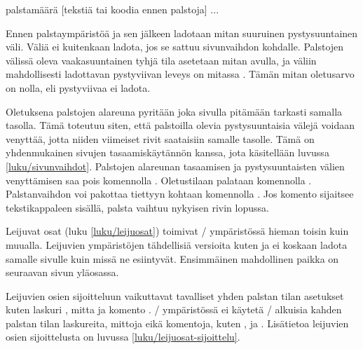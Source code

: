 \begin{koodilohkosis}
\begin{multicols}{palstamäärä}
  [tekstiä tai koodia ennen palstoja]
  ...
\end{multicols}
\end{koodilohkosis}

\noindent
Ennen palstaympäristöä ja sen jälkeen ladotaan mitan 
suuruinen pystysuuntainen väli. Väliä ei kuitenkaan ladota, jos se
sattuu sivunvaihdon kohdalle. Palstojen välissä oleva vaakasuuntainen
tyhjä tila asetetaan mitan  avulla, ja väliin
mahdollisesti ladottavan pystyviivan leveys on mitassa
. Tämän mitan oletusarvo on nolla, eli pystyviivaa
ei ladota.

\begin{koodilohkosis}
\setlength{\multicolsep}{.5ex plus .2ex}  %
\setlength{\columnsep}{6mm}               %
\setlength{\columnseprule}{.2mm}          %
\end{koodilohkosis}

\noindent
Oletuksena palstojen alareuna pyritään joka sivulla pitämään tarkasti
samalla tasolla. Tämä toteutuu siten, että palstoilla olevia
pystysuuntaisia välejä voidaan venyttää, jotta niiden viimeiset rivit
saataisiin samalle tasolle. Tämä on yhdenmukainen sivujen
tasaamiskäytännön kanssa, jota käsitellään luvussa
\ref{luku/sivunvaihdot}. Palstojen alareunan tasaamisen ja
pystysuuntaisten välien venyttämisen saa pois komennolla
. Oletustilaan palataan komennolla
. Palstanvaihdon voi pakottaa tiettyyn kohtaan
komennolla . Jos komento sijaitsee tekstikappaleen
sisällä, palsta vaihtuu nykyisen rivin lopussa.

Leijuvat osat (luku \ref{luku/leijuosat}) toimivat
\-/ ympäristössä hieman toisin kuin muualla.
Leijuvien ympäristöjen tähdellisiä versioita kuten  ja
 ei koskaan ladota samalle sivulle kuin missä ne
esiintyvät. Ensimmäinen mahdollinen paikka on seuraavan sivun yläosassa.

Leijuvien osien sijoitteluun vaikuttavat tavalliset yhden palstan tilan
asetukset kuten laskuri , mitta  ja
komento . \-/ ympäristössä ei
käytetä \-/ alkuisia kahden palstan tilan laskureita, mittoja
eikä komentoja, kuten ,  ja
. Lisätietoa leijuvien osien sijoittelusta on
luvussa \ref{luku/leijuosat-sijoittelu}.

